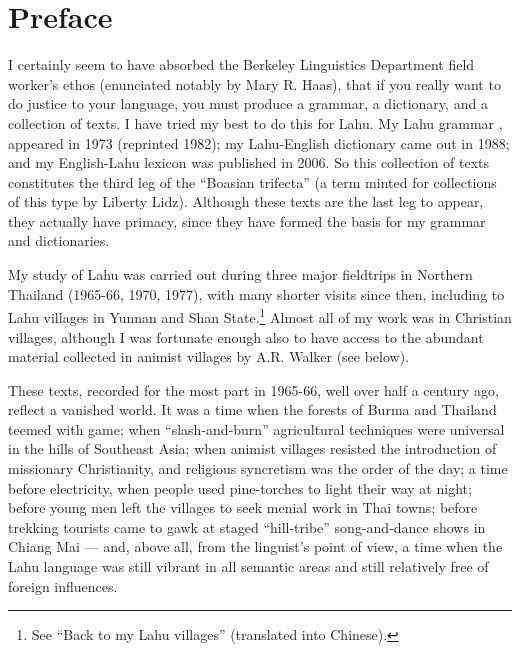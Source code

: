 \thispagestyle{empty}
\renewcommand{\thefootnote}{\arabic{footnote}}
\setcounter{footnote}{0}


\section*{Preface}
I certainly seem to have absorbed the Berkeley Linguistics Department
field worker's ethos (enunciated notably by Mary R. Haas), that if you
really want to do justice to your language, you must produce a grammar,
a dictionary, and a collection of texts. I have tried my best to do this
for Lahu. My Lahu grammar \citep[abbreviated ``GL'']{matisoff1973grammar}, appeared in 1973 (reprinted 1982); my
Lahu-English dictionary \citep[abbreviated ``DL'']{88} came out in 1988; and my English-Lahu
lexicon \citep[abbreviated ``ELL'']{matisoff2006english} was published in 2006. So this collection of texts
constitutes the third leg of the ``Boasian trifecta'' (a term minted for collections of this type by Liberty Lidz).
Although these texts are the
last leg to appear, they actually have primacy, since they have formed
the basis for my grammar and dictionaries.

My study of Lahu was carried out during three major fieldtrips in
Northern Thailand (1965-66, 1970, 1977), with many shorter visits since
then, including to Lahu villages in Yunnan and Shan State.\footnote{See
\citet{matisoff2008} ``Back to my Lahu villages'' (translated into Chinese).} Almost all of my
work was in Christian villages, although I was fortunate enough also to
have access to the abundant material collected in animist villages by
A.R. Walker (see below).

These texts, recorded for the most part in 1965-66, well over half a century
ago, reflect a vanished world. It was a time when the forests of Burma and
Thailand teemed with game; when ``slash-and-burn'' agricultural techniques
were universal in the hills of Southeast Asia; when animist villages
resisted the introduction of missionary Christianity, and religious
syncretism was the order of the day; a time before electricity, when
people used pine-torches to light their way at night; before young men
left the villages to seek menial work in Thai towns; before trekking
tourists came to gawk at staged ``hill-tribe'' song-and-dance shows in
Chiang Mai --- and, above all, from the linguist's point of view, a
time when the Lahu language was still vibrant in all semantic areas and
still relatively free of foreign influences.

